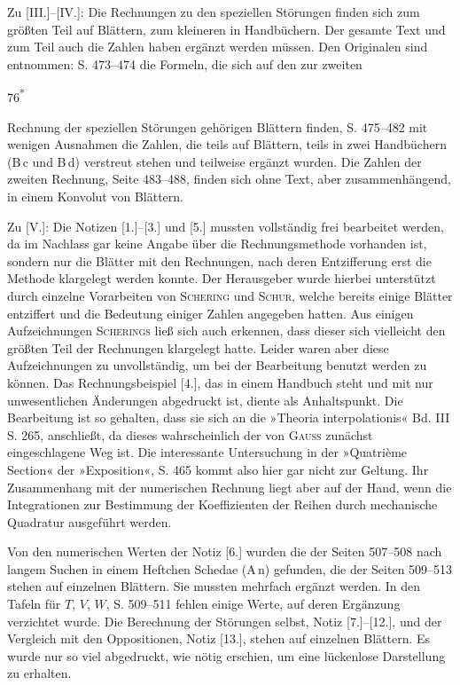 \begingroup
{}
\renewcommand{\headrulewidth}{0pt}
\par\noindent\hspace*{\parindent}Zu [III.]--[IV.]: Die Rechnungen zu den speziellen Störungen finden sich
zum größten Teil auf Blättern, zum kleineren in Handbüchern. Der gesamte Text
und zum Teil auch die Zahlen haben ergänzt werden müssen. Den Originalen sind
entnommen: S. 473--474 die Formeln, die sich auf den zur zweiten
\par\smallskip\noindent\hfill 76\textsuperscript{*}\par
\noindent{}Rechnung der speziellen Störungen gehörigen Blättern finden,
S. 475--482 mit wenigen Ausnahmen die Zahlen, die teils auf Blättern, teils in
zwei Handbüchern (B\,c und B\,d) verstreut stehen und teilweise ergänzt wurden.
Die Zahlen der zweiten Rechnung, Seite 483--488, finden sich ohne Text,
aber zusammenhängend, in einem Konvolut von Blättern.

\par\noindent\hspace*{\parindent}Zu [V.]: Die Notizen [1.]--[3.] und [5.] mussten vollständig frei bearbeitet
werden, da im Nachlass gar keine Angabe über die Rechnungsmethode vorhanden
ist, sondern nur die Blätter mit den Rechnungen, nach deren Entzifferung erst die
Methode klargelegt werden konnte. Der Herausgeber wurde hierbei unterstützt durch
einzelne Vorarbeiten von \textsc{Schering} und \textsc{Schur}, welche bereits einige Blätter
entziffert und die Bedeutung einiger Zahlen angegeben hatten. Aus einigen
Aufzeichnungen \textsc{Scherings} ließ sich auch erkennen, dass dieser sich vielleicht
den größten Teil der Rechnungen klargelegt hatte. Leider waren aber diese
Aufzeichnungen zu unvollständig, um bei der Bearbeitung benutzt werden zu können.
Das Rechnungsbeispiel [4.], das in einem Handbuch steht und mit nur unwesentlichen
Änderungen abgedruckt ist, diente als Anhaltspunkt. Die Bearbeitung ist so gehalten,
dass sie sich an die »Theoria interpolationis« Bd. III S. 265, anschließt, da
dieses wahrscheinlich der von \textsc{Gauss} zunächst eingeschlagene Weg ist.
Die interessante Untersuchung in der »Quatrième Section« der »Exposition«, S. 465
kommt also hier gar nicht zur Geltung. Ihr Zusammenhang mit der numerischen
Rechnung liegt aber auf der Hand, wenn die Integrationen zur Bestimmung der
Koeffizienten der Reihen durch mechanische Quadratur ausgeführt werden.

\par\noindent\hspace*{\parindent}Von den numerischen Werten der Notiz [6.] wurden die der Seiten 507--508
nach langem Suchen in einem Heftchen Schedae (A\,n) gefunden, die der Seiten 509--513
stehen auf einzelnen Blättern. Sie mussten mehrfach ergänzt werden. In den Tafeln
für \(T\), \(V\), \(W\), S. 509--511 fehlen einige Werte, auf deren Ergänzung verzichtet wurde.
Die Berechnung der Störungen selbst, Notiz [7.]--[12.], und der Vergleich mit
den Oppositionen, Notiz [13.], stehen auf einzelnen Blättern. Es wurde nur so viel
abgedruckt, wie nötig erschien, um eine lückenlose Darstellung zu erhalten.

